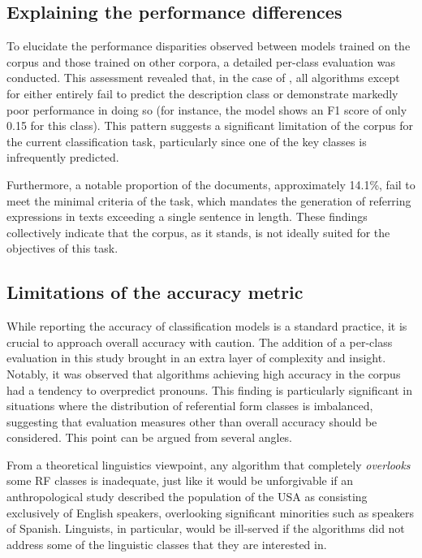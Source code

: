 \subsection{Explaining the performance differences} 
To elucidate the performance disparities observed between models trained on the \negcor corpus and those trained on other corpora, a detailed per-class evaluation was conducted. This assessment revealed that, in the case of \negcor, all algorithms except for  either entirely fail to predict the description class or demonstrate markedly poor performance in doing so (for instance, the  model shows an F1 score of only 0.15 for this class). This pattern suggests a significant limitation of the \negcor corpus for the current classification task, particularly since one of the key classes is infrequently predicted. 

Furthermore, a notable proportion of the \negcor documents, approximately 14.1\%, fail to meet the minimal criteria of the \grec task, which mandates the generation of referring expressions in texts exceeding a single sentence in length. These findings collectively indicate that the \negcor corpus, as it stands, is not ideally suited for the objectives of this task.

\subsection{Limitations of the accuracy metric} 

While reporting the accuracy of classification models is a standard practice, it is crucial to approach overall accuracy with caution. The addition of a per-class evaluation in this study brought in an extra layer of complexity and insight. Notably, it was observed that algorithms achieving high accuracy in the \negcor corpus had a tendency to overpredict pronouns. This finding is particularly significant in situations where the distribution of referential form classes is imbalanced, suggesting that evaluation measures other than overall accuracy should be considered. This point can be argued from several angles.

From a theoretical linguistics viewpoint, 
any algorithm that completely \emph{overlooks} some RF classes is inadequate, just like it would be unforgivable if an anthropological study described the population of the USA as consisting exclusively of English speakers, overlooking significant minorities such as speakers of Spanish. Linguists, in particular, would be ill-served if the algorithms did not address some of the linguistic classes that they are interested in.

